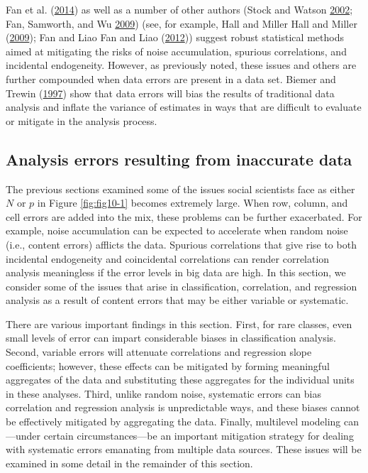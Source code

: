 \documentclass[]{krantz}
\begin{document}
Fan et al. (\protect\hyperlink{ref-fan2014challenges}{2014}) as well as
a number of other authors (Stock and Watson
\protect\hyperlink{ref-stock2002forecasting}{2002}; Fan, Samworth, and
Wu \protect\hyperlink{ref-fan2009ultrahigh}{2009}) (see, for example,
Hall and Miller Hall and Miller
(\protect\hyperlink{ref-HallMiller2009}{2009}); Fan and Liao Fan and
Liao (\protect\hyperlink{ref-FanLiao2012}{2012})) suggest robust
statistical methods aimed at mitigating the risks of noise accumulation,
spurious correlations, and incidental endogeneity. However, as
previously noted, these issues and others are further compounded when
data errors are present in a data set. Biemer and Trewin
(\protect\hyperlink{ref-biemer1997review}{1997}) show that data errors
will bias the results of traditional data analysis and inflate the
variance of estimates in ways that are difficult to evaluate or mitigate
in the analysis process.

\subsection{Analysis errors resulting from inaccurate
data}\label{sec:10-4.2}

The previous sections examined some of the issues social scientists face
as either \(N\) or \(p\) in Figure \ref{fig:fig10-1} becomes extremely
large. When row, column, and cell errors are added into the mix, these
problems can be further exacerbated. For example, noise accumulation can
be expected to accelerate when random noise (i.e., content errors)
afflicts the data. Spurious correlations that give rise to both
incidental endogeneity and coincidental correlations can render
correlation analysis meaningless if the error levels in big data are
high. In this section, we consider some of the issues that arise in
classification, correlation, and regression analysis as a result of
content errors that may be either variable or systematic.

There are various important findings in this section. First, for rare
classes, even small levels of error can impart considerable biases in
classification analysis. Second, variable errors will attenuate
correlations and regression slope coefficients; however, these effects
can be mitigated by forming meaningful aggregates of the data and
substituting these aggregates for the individual units in these
analyses. Third, unlike random noise, systematic errors can bias
correlation and regression analysis is unpredictable ways, and these
biases cannot be effectively mitigated by aggregating the data. Finally,
multilevel modeling can---under certain circumstances---be an important
mitigation strategy for dealing with systematic errors emanating from
multiple data sources. These issues will be examined in some detail in
the remainder of this section.
\end{document}

